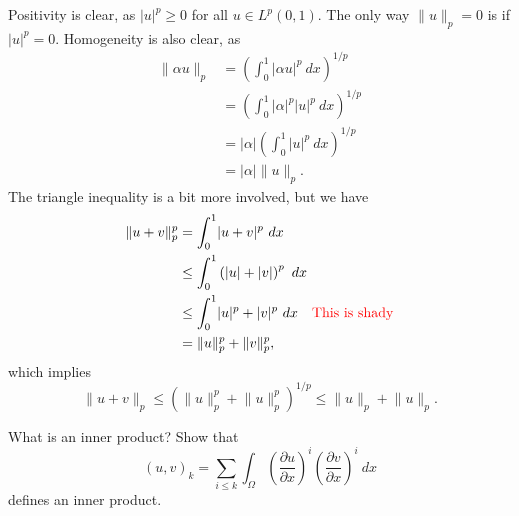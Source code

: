 \begin{solution}
    Positivity is clear, as $\lvert u \rvert^p \geq 0$ for all $u \in L^p(0, 1)$.
    The only way $\lVert u \rVert_p = 0$ is if $\lvert u \rvert^p = 0$.
    Homogeneity is also clear, as
    \begin{align*}
        \lVert \alpha u \rVert_p &= \left( \int_{0}^{1} \lvert \alpha u \rvert^p \ dx \right)^{1/p} \\
        &= \left( \int_{0}^{1} \lvert \alpha \rvert^p \lvert u \rvert^p \ dx \right)^{1/p} \\
        &= \lvert \alpha \rvert \left( \int_{0}^{1} \lvert u \rvert^p \ dx \right)^{1/p} \\
        &= \lvert \alpha \rvert \lVert u \rVert_p.
    \end{align*}
    The triangle inequality is a bit more involved, but we have
    \begin{align*}
        \lVert u + v \rVert_p^p &= \int_{0}^{1} \lvert u + v \rvert^p \ dx \\
        &\leq \int_{0}^{1} \left( \lvert u \rvert + \lvert v \rvert \right)^p \ dx \\
        &\leq \int_{0}^{1} \lvert u \rvert^p + \lvert v \rvert^p \ dx \quad \textcolor{red}{\text{This is shady}} \\
        &= \lVert u \rVert_p^p + \lVert v \rVert_p^p,
    \end{align*}
    which implies
    \begin{equation*}
        \lVert u + v \rVert_p \leq \left( \lVert u \rVert_p^p + \lVert u \rVert_p^p \right)^{1/p} \leq \lVert u \rVert_p + \lVert u \rVert_p.
    \end{equation*}
\end{solution}

\begin{exercise}
    What is an inner product? Show that
    \begin{equation*}
        (u, v)_k = \sum_{i \leq k} \int_{\Omega} \left( \frac{\partial u}{\partial x} \right)^i \left( \frac{\partial v}{\partial x} \right)^i \ dx
    \end{equation*}
    defines an inner product.
\end{exercise}

